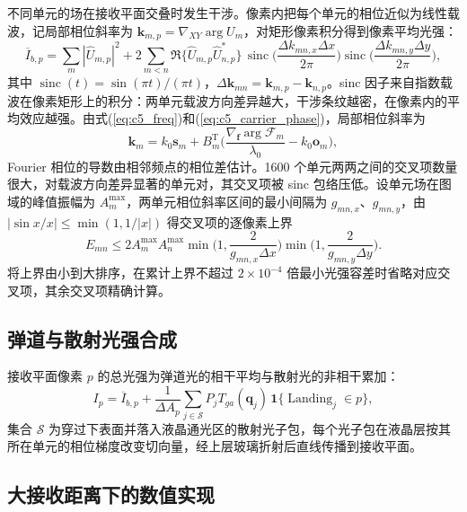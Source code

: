 不同单元的场在接收平面交叠时发生干涉。像素内把每个单元的相位近似为线性载波，记局部相位斜率为 $\mathbf k_{m,p}=\nabla_{XY}\arg U_m$，对矩形像素积分得到像素平均光强：
\begin{equation}
\overline I_{b,p}=\sum_m|\widehat U_{m,p}|^2+2\sum_{m<n}\Re\{\widehat U_{m,p}\widehat U_{n,p}^*\}\,
\operatorname{sinc}\!\Big(\frac{\Delta k_{mn,x}\Delta x}{2\pi}\Big)\operatorname{sinc}\!\Big(\frac{\Delta k_{mn,y}\Delta y}{2\pi}\Big),
\label{eq:c5_pixel}
\end{equation}
其中 $\operatorname{sinc}(t)=\sin(\pi t)/(\pi t)$，$\Delta\mathbf k_{mn}=\mathbf k_{m,p}-\mathbf k_{n,p}$。sinc 因子来自指数载波在像素矩形上的积分：两单元载波方向差异越大，干涉条纹越密，在像素内的平均效应越强。由式(\ref{eq:c5_freq})和(\ref{eq:c5_carrier_phase})，局部相位斜率为
\begin{equation}
\mathbf k_m=k_0\mathbf s_m+B_m^{\mathrm T}\Big(\frac{\nabla_{\mathbf f}\arg\mathcal F_m}{\lambda_0}-k_0\mathbf o_m\Big),
\label{eq:c5_slope}
\end{equation}
Fourier 相位的导数由相邻频点的相位差估计。1600 个单元两两之间的交叉项数量很大，对载波方向差异显著的单元对，其交叉项被 sinc 包络压低。设单元场在图域的峰值振幅为 $A_m^{\max}$，两单元相位斜率区间的最小间隔为 $g_{mn,x}$、$g_{mn,y}$，由 $|\sin x/x|\le\min(1,1/|x|)$ 得交叉项的逐像素上界
\begin{equation}
E_{mn}\le2A_m^{\max}A_n^{\max}\min\Big(1,\frac{2}{g_{mn,x}\Delta x}\Big)\min\Big(1,\frac{2}{g_{mn,y}\Delta y}\Big).
\label{eq:c5_bound}
\end{equation}
将上界由小到大排序，在累计上界不超过 $2\times10^{-4}$ 倍最小光强容差时省略对应交叉项，其余交叉项精确计算。

\subsection{弹道与散射光强合成}

接收平面像素 $p$ 的总光强为弹道光的相干平均与散射光的非相干累加：
\begin{equation}
I_p=\overline I_{b,p}+\frac{1}{\Delta A_p}\sum_{j\in\mathcal S}P_jT_{ga}(\mathbf q_j)\,\mathbf 1\{\operatorname{Landing}_j\in p\},
\label{eq:c5_total}
\end{equation}
集合 $\mathcal S$ 为穿过下表面并落入液晶通光区的散射光子包，每个光子包在液晶层按其所在单元的相位梯度改变切向量，经上层玻璃折射后直线传播到接收平面。

\subsection{大接收距离下的数值实现}

